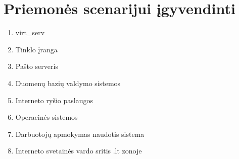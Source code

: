 \section{Priemonės scenarijui įgyvendinti}
\begin{enumerate}
  \item \Gls{virt_serv}
	\item Tinklo įranga
	\item Pašto serveris
	\item Duomenų bazių valdymo sistemos
	\item Interneto ryšio paslaugos
	\item Operacinės sistemos
	\item Darbuotojų apmokymas naudotis sistema
	\item Interneto svetainės vardo sritis .lt zonoje
\end{enumerate}
